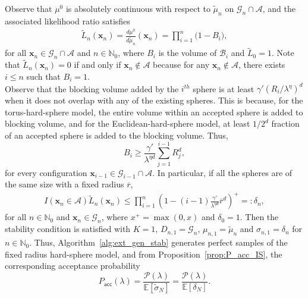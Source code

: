 \documentclass[11pt]{article}
\newcommand{\ee}{\mathbb{E}}
\newcommand{\rbdd}{\overline{r}}
\newcommand{\mbb}{\mathbb}
\newcommand{\lt}{\left}
\newcommand{\rt}{\right}
\newcommand{\wt}{\widetilde}
\newcommand{\pno}{\mathcal{P}(\lambda)}
\newcommand{\lfs}{\mathbf{x}}
\begin{document}
 Observe that $\mu^0$ is absolutely continuous with respect to $\wt \mu_n$ on $\mathscr{G}_n \cap \mathscr{A}$, and the associated likelihood
ratio satisfies 
\begin{align}
\label{eqn:LHRatio1}
 \wt L_n(\lfs_n) = \frac{d \mu^0}{d\wt \mu_n}(\lfs_n) = \prod_{i=1}^{n}\Big(1 - B_{i}\Big),
\end{align}
for all $\lfs_n \in \mathscr{G}_n \cap \mathscr{A}$ and $n \in \mbb{N}_0$, where {$B_{i}$ is the volume of $\mathcal{B}_i$} and $ \wt L_0 = 1$. Note that $\wt L_n(\lfs_n) = 0$ if and only if $\lfs_n \notin \mathscr{A}$ because for any $\lfs_n \notin \mathscr{A}$, there exists $i \leq n$ such that $B_i = 1$.\\


Observe that the blocking volume added by the $i^{th}$ sphere is at least $\gamma' \lt(R_i/\lambda^{\eta}\rt)^d$ when it does not overlap with any of the existing spheres.
This is because, for the torus-hard-sphere model, the entire volume within an accepted sphere is added to blocking volume, and for
the Euclidean-hard-sphere model, at least $1/2^d$ fraction of an accepted sphere is added to the blocking  volume. Thus,
\begin{equation}
\label{eqn:bni}
B_{i}\geq  \frac{\gamma'}{ \lambda^{\eta d}} \sum_{j =1}^{i-1} R_j^d,
\end{equation}
for every configuration $\lfs_{i-1} \in  \mathscr{G}_{i-1} \cap \mathscr{A}$. 
In particular, if all the spheres are of the same size with a fixed radius $\rbdd$, 
\begin{align}
\label{eqn:LHRatio_bdd}
 I(\lfs_n \in \mathscr{A}) \wt L_n(\lfs_n) \leq \prod_{i = 1}^{n} \lt( 1 - (i-1)\frac{\gamma'}{ \lambda^{\eta d}}  \rbdd^d\rt)^+ =: \delta_{n},
\end{align}
for all $n \in \mbb{N}_0$ and $\lfs_n \in  \mathscr{G}_n $, where $x^+ = \max(0,x)$ and $\delta_{0} = 1$. Then the stability condition is satisfied with $K = 1$, $D_{n,1} = \mathscr{G}_n $, $\mu_{n,1} = \wt \mu_n$  and $\sigma_{n,1} = \delta_n$ for $n \in \mbb{N}_0$. Thus, Algorithm~\ref{alg:ext_gen_stab} generates perfect samples of the fixed radius hard-sphere model, and from Proposition~\ref{prop:P_acc_IS}, the corresponding acceptance probability $$P_{\mathsf{acc}}(\lambda) = \frac{\pno}{\ee[\wt \sigma_N]} = \frac{\pno}{\ee[\delta_{N}]}.$$
\end{document}
